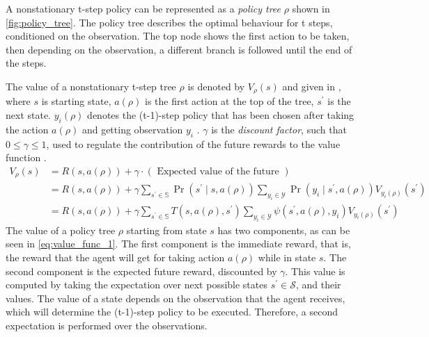A nonstationary t-step policy can be represented as a \textit{policy tree} $ \rho $ shown in \autoref{fig:policy_tree}. The policy tree describes the optimal behaviour for t steps, conditioned on the observation. The top node shows the first action to be taken, then depending on the observation, a different branch is followed until the end of the steps. \par
The value of a nonstationary t-step tree $ \rho $ is denoted by $ V_\rho(s) $ and given in , where $ s $ is starting state, $ a(\rho) $ is the first action at the top of the tree, $ s^\prime $ is the next state. $ y_{i}(\rho) $ denotes the (t-1)-step policy that has been chosen after taking the action $ a(\rho) $ and getting observation $ y_i $ \cite{KAELBLING199899}. $ \gamma $ is the \textit{discount factor}, such that $ 0\leq \gamma \leq 1 $, used to regulate the contribution of the future rewards to the value function \cite{Sutton2018}.
\begin{align} 
V_{\rho}(s) &=R(s, a(\rho))+\gamma \cdot(\text { Expected value of the future }) \label{eq:value_func_1}\\
&=R(s, a(\rho))+\gamma \sum_{s^{\prime} \in \mathbb{S}} \operatorname{Pr}\left(s^{\prime} \mid s, a(\rho)\right) \sum_{y_{i} \in \mathcal{Y}} \operatorname{Pr}\left(y_{i} \mid s^{\prime}, a(\rho)\right) V_{y_{i}(\rho)}\left(s^{\prime}\right) \label{eq:value_func_2}\\
&=R(s, a(\rho))+\gamma \sum_{s^{\prime} \in \mathbb{S}} T\left(s, a(\rho), s^{\prime}\right) \sum_{y_{i} \in \mathcal{Y}} \psi\left(s^{\prime}, a(\rho), y_{i}\right) V_{y_{i}(\rho)}\left(s^{\prime}\right) \label{eq:value_of_tree}
\end{align}
The value of a policy tree $ \rho $ starting from state $ s $ has two components, as can be seen in \autoref{eq:value_func_1}. The first component is the immediate reward, that is, the reward that the agent will get for taking action $ a(\rho) $ while in state $ s $. The second component is the expected future reward, discounted by $ \gamma $. This value is computed by taking the expectation over next possible states $ s^\prime \in \mathcal{S} $, and their values. The value of a state depends on the observation that the agent receives, which will determine the (t-1)-step policy to be executed. Therefore, a second expectation is performed over the observations. \par
